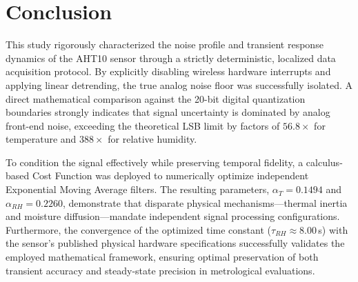 \section{Conclusion}
This study rigorously characterized the noise profile and transient response dynamics of the AHT10 sensor through a strictly deterministic, localized data acquisition protocol. 
By explicitly disabling wireless hardware interrupts and applying linear detrending, the true analog noise floor was successfully isolated. 
A direct mathematical comparison against the 20-bit digital quantization boundaries strongly indicates that signal uncertainty is dominated by analog front-end noise, exceeding the theoretical LSB limit by factors of $56.8\times$ for temperature and $388\times$ for relative humidity. 

To condition the signal effectively while preserving temporal fidelity, a calculus-based Cost Function was deployed to numerically optimize independent Exponential Moving Average filters. 
The resulting parameters, $\alpha_T = 0.1494$ and $\alpha_{RH} = 0.2260$, demonstrate that disparate physical mechanisms—thermal inertia and moisture diffusion—mandate independent signal processing configurations. 
Furthermore, the convergence of the optimized time constant ($\tau_{RH} \approx 8.00$\,s) with the sensor's published physical hardware specifications successfully validates the employed mathematical framework, ensuring optimal preservation of both transient accuracy and steady-state precision in metrological evaluations.
